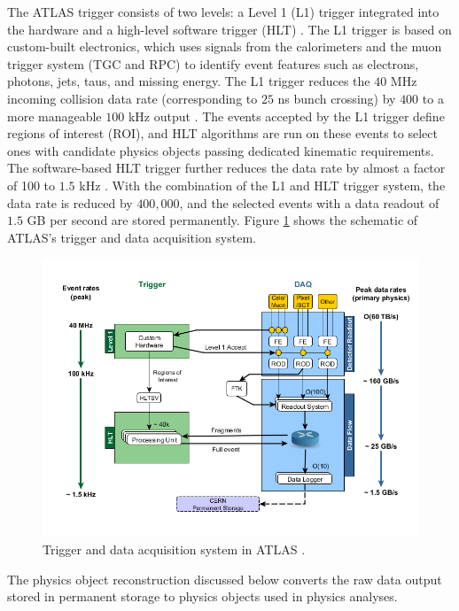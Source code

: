 The ATLAS trigger consists of two levels: a Level 1 (L1) trigger integrated into the hardware and a high-level software trigger (HLT) \cite{TriggerSystemATLAS}. The L1 trigger is based on custom-built electronics, which uses signals from the calorimeters and the muon trigger system (TGC and RPC) to identify event features such as electrons, photons, jets, taus, and missing energy. The L1 trigger reduces the $40$ MHz incoming collision data rate (corresponding to $25$ ns bunch crossing) by $400$ to a more manageable $100$ kHz output \cite{TriggerSystemATLAS}. The events accepted by the L1 trigger define regions of interest (ROI), and HLT algorithms are run on these events to select ones with candidate physics objects passing dedicated kinematic requirements. The software-based HLT trigger further reduces the data rate by almost a factor of 100 to $1.5$ kHz \cite{ATLAS}. With the combination of the L1 and HLT trigger system, the data rate is reduced by $400,000$, and the selected events with a data readout of $1.5$ GB per second are stored permanently. Figure \ref{fig:DAQ} shows the schematic of ATLAS's trigger and data acquisition system. 

\begin{figure}[!htb]
    \centering
    \includegraphics[width=.8\linewidth]{figures/LHC/DAQ_ATLAS.png}
    \caption{ Trigger and data acquisition system in ATLAS \cite{ATLAS_DAQ}.\label{fig:DAQ}}
\end{figure}

The physics object reconstruction discussed below converts the raw data output stored in permanent storage to physics objects used in physics analyses. 

